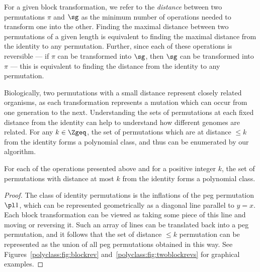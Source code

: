 \documentclass[12pt,twoside]{memoir}
\begin{document}
      For a given block transformation, we refer to the \emph{distance} between
      two permutations $\pi$ and $\sg$ as the minimum number of operations needed
      to transform one into the other. Finding the maximal distance between two
      permutations of a given length is equivalent to finding the maximal
      distance from the identity to any permutation. Further, since each of these
      operations is reversible --- if $\pi$ can be transformed into $\sg$, then
      $\sg$ can be transformed into $\pi$ --- this is equivalent to finding the
      distance from the identity to any permutation. 


      Biologically, two permutations with a small distance represent closely
      related organisms, as each transformation represents a mutation which can
      occur from one generation to the next. Understanding the sets of
      permutations at each fixed distance from the identity can help to
      understand how different genomes are related. For any $k \in \Zgeq$, the
      set of permutations which are at distance $\leq k$ from the identity forms
      a polynomial class, and thus can be enumerated by our algorithm. 

      \begin{theorem} \label{polyclass:def:operation-polyclass}
        For each of the operations presented above and for a positive integer
        $k$, the set of permutations with distance at most $k$ from the identity
        forms a polynomial class. 
      \end{theorem}
      \begin{proof}
        The class of identity permutations is the inflations of the peg
        permutation $\pl 1$, which can be represented geometrically as a diagonal
        line parallel to $y =x $. Each block transformation can be viewed as
        taking some piece of this line and moving or reversing it. Such an array
        of lines can be translated back into a peg permutation, and it follows
        that the set of distance $\leq k$ permutation can be represented as the
        union of all peg permutations obtained in this way.  See
        Figures~\ref{polyclass:fig:blockrev} and~\ref{polyclass:fig:twoblockrevs}
        for graphical examples. 
      \end{proof}
\end{document}
